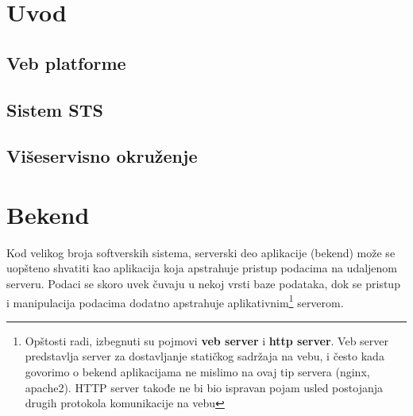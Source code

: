 \documentclass[12pt,oneside]{memoir}
\begin{document}
\frontmatter
\naslovna
\komisija
\apstrakt
\tableofcontents*

\mainmatter

\chapter{Uvod}

\section{Veb platforme}
\section{Sistem STS}
\section{Višeservisno okruženje}

\chapter{Bekend}
Kod velikog broja softverskih sistema, serverski deo aplikacije (bekend) može se uopšteno shvatiti kao aplikacija koja apstrahuje pristup podacima na udaljenom serveru. Podaci se skoro uvek čuvaju u nekoj vrsti baze podataka, dok se pristup i manipulacija podacima dodatno apstrahuje aplikativnim\footnote{Opštosti radi, izbegnuti su pojmovi \textbf{veb server} i \textbf{http server}. Veb server predstavlja server za dostavljanje statičkog sadržaja na vebu, i često kada govorimo o bekend aplikacijama ne mislimo na ovaj tip servera (nginx, apache2). HTTP server takođe ne bi bio ispravan pojam usled postojanja drugih protokola komunikacije na vebu} serverom.
\end{document}
